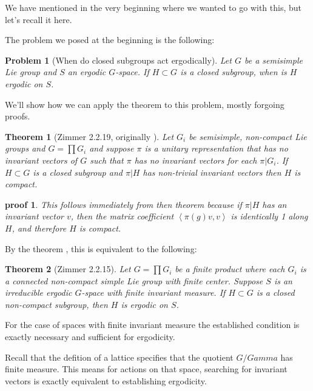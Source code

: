 \documentclass[
  12pt
]{article}
\newtheorem{thm}{Theorem}[section]
\newtheorem*{problem}{Problem}
\theoremstyle{plain}
\newtheorem*{pf}{proof}
\newcommand{\G}{\ensuremath{G}\xspace}
\newcommand{\mpi}{\ensuremath{\pi}\xspace}
\newcommand{\inn}[1]{\left\langle #1 \right\rangle}
\begin{document}
  We have mentioned in the very beginning where we wanted to go with this, but let's recall it here.

  The problem we posed at the beginning is the following:

  \begin{problem}[When do closed subgroups act ergodically]
    Let \G be a semisimple Lie group and $S$ an ergodic \G-space. If $H\subset G$ is a closed subgroup, when is $H$ ergodic on $S$.
  \end{problem}

  We'll show how we can apply the theorem to this problem, mostly forgoing proofs.

  \begin{thm}[Zimmer 2.2.19, originally \citeauthor{Moore66}\cite{Moore66}]
    \label{thm:2.2.19}
     Let $G_i$ be semisimple, non-compact Lie groups and $G = \prod G_i$ and
     suppose \mpi is a unitary representation that has no invariant vectors of
     \G such that \mpi has no invariant vectors for each $\pi|G_i$. If $H
     \subset G$ is a closed subgroup and $\pi|H$ has non-trivial invariant
     vectors then $H$ is compact.
  \end{thm}

  \begin{pf}
    This follows immediately from then theorem because if $\pi|H$ has an invariant vector $v$, then the matrix coefficient $\inn{\pi(g)v,v}$ is identically 1 along $H$, and therefore $H$ is compact.
  \end{pf}


  By the theorem , this is equivalent to the following:


  \begin{thm}[Zimmer 2.2.15]
    \label{thm:2.2.15}
    Let $G = \prod G_i$ be a finite product where each $G_i$ is a connected
    non-compact simple Lie group with finite center. Suppose $S$ is an
    irreducible ergodic \G-space with finite invariant measure. If $H \subset
    G$ is a closed non-compact subgroup, then $H$ is ergodic on $S$.
  \end{thm}

  For the case of spaces with finite invariant measure the established condition is exactly necessary and sufficient for ergodicity.

  Recall that the defition of a lattice specifies that the quotient $G/Gamma$ has finite measure. This means for actions on that space, searching for invariant vectors is exactly equivalent to establishing ergodicity.
\end{document}
